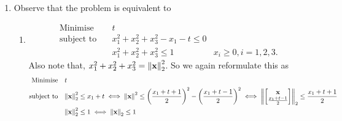 \begin{enumerate}
\begin{enumerate}[label=(\alph*)]
                    \(X_{12}^2 \leq 1 \implies -1 \leq X_{12} \leq 1\) (since \(\det X \geq 0\)). Thus,
                    \begin{align*}
                        \tr(CX) & = 2 + 4X_{12}   \\
                                & \geq 2 + 4(-1)
                                & -2 = \tr(CX^*).
                    \end{align*}
                    So, for all feasible \(X\) for \((P_0)\), \(\tr(CX) \geq tr(CX^*)\). This shows that \(X^*\) is an optimal solution for \((P_0)\).
          \end{enumerate}
    \item Observe that the problem is equivalent to
          \begin{enumerate}[label=(\arabic*)]
              \item \begin{align*}
                        \text{Minimise} \quad   & t                                      \\
                        \text{subject to} \quad & x_1^2 + x_2^2 + x_3^2 - x_1 - t \leq 0 \\
                                                & x_1^2 + x_2^2 + x_3^2 \leq 1
                                                & x_i \geq 0, i = 1, 2, 3.
                    \end{align*}
                    Also note that, \(x_1^2 + x_2^2 + x_3^2 = \norm{\mathbf{x}}_2^2\). So we again reformulate this as
                    \begin{align*}
                        \text{Minimise} \quad   & t                                                                                                                                                                                                   \\
                        \text{subject to} \quad & \norm{\fx}_2^2 \leq x_1 + t \iff \norm{\fx}^2 \leq \left(\frac{x_1 + t + 1}{2}\right)^2 - \left(\frac{x_1 + t - 1}{2}\right)^2 \iff \norm{\begin{bmatrix} \fx \\ \frac{x_1 + t - 1}{2}\end{bmatrix}}_2 \leq \frac{x_1 + t + 1}{2} \\
                                                & \norm{\fx}_2^2 \leq 1 \iff \norm{\fx}_2 \leq 1                                                                                                                                                      \\

\end{align*}
\end{enumerate}
\end{enumerate}
